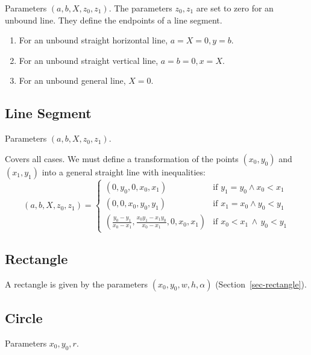 \documentclass[11pt]{article}
\begin{document}
Parameters $(a, b, X, z_0, z_1)$.
The parameters $z_0, z_1$ are set to zero for an unbound line. They define
the endpoints of a line segment.

\begin{enumerate}
    \item For an unbound straight horizontal line, $a=X=0, y=b$.
    \item For an unbound straight vertical line, $a=b=0, x=X$.
    \item For an unbound general line, $X=0$.
\end{enumerate}

\subsection{Line Segment}
\label{sec-representation-line-segment}

Parameters $(a, b, X, z_0, z_1)$.

Covers all cases. We must define a transformation of the points $(x_0, y_0)$
and $(x_1, y_1)$  into a general straight line with inequalities:
\begin{equation}
    (a, b, X, z_0, z_1) =
    \begin{cases}
        (0, y_0, 0, x_0, x_1)  &
        \text{if $y_1 = y_0\land x_0 < x_1$}\\
        (0, 0, x_0, y_0, y_1) &
        \text{if $x_1 = x_0\land  y_0 < y_1 $}\\
        \left(\frac{y_0 - y_1}{x_0-x_1},
            \frac{x_0 y_1 - x_1 y_0}{x_0 - x_1}, 0, x_0, x_1\right) &
            \text{if $x_0< x_1\,\land\,y_0< y_1$}
    \end{cases}
\end{equation}

\subsection{Rectangle}

A rectangle is given by the parameters $(x_0, y_0, w, h, \alpha)$
(Section~\ref{sec-rectangle}).


\subsection*{Circle}

Parameters $x_0, y_0, r$.
\end{document}

